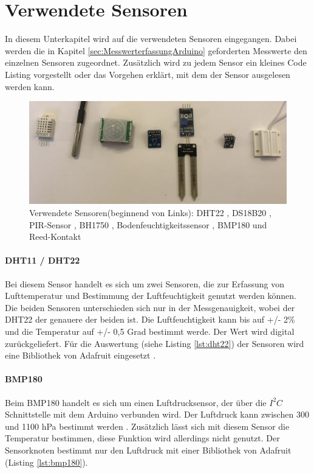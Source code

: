 \section{Verwendete Sensoren}
In diesem Unterkapitel wird auf die verwendeten Sensoren eingegangen. Dabei werden die in Kapitel \ref{sec:MesswerterfassungArduino} geforderten Messwerte den einzelnen Sensoren zugeordnet. Zusätzlich wird zu jedem Sensor ein kleines Code Listing vorgestellt oder das Vorgehen erklärt, mit dem der Sensor ausgelesen werden kann.
\begin{figure}
	\centering
	\includegraphics[width=1\textwidth]{bilder/sensoren.jpg}
	\caption[Verwendete Sensoren]{Verwendete Sensoren(beginnend von Links): DHT22 , DS18B20 , PIR-Sensor , BH1750 , Bodenfeuchtigkeitssensor , BMP180  und Reed-Kontakt}
	\label{sec:KonzeptionMeshNetz}
\end{figure}

\paragraph{DHT11 / DHT22} Bei diesem Sensor handelt es sich um zwei Sensoren, die zur Erfassung von Lufttemperatur und Bestimmung der Luftfeuchtigkeit genutzt werden können. Die beiden Sensoren unterschieden sich nur in der Messgenauigkeit, wobei der DHT22 der genauere der beiden ist. Die Luftfeuchtigkeit kann bis auf +/- 2\% und die Temperatur auf +/- 0,5 Grad bestimmt werde. Der Wert wird digital zurückgeliefert. Für die Auswertung (siehe Listing \ref{lst:dht22}) der Sensoren wird eine Bibliothek von Adafruit eingesetzt \cite{adafruit2016dht}.



\paragraph{BMP180} Beim BMP180 handelt es sich um einen Luftdrucksensor, der über die $I^2C$ Schnittstelle mit dem Arduino verbunden wird. Der Luftdruck kann zwischen 300 und 1100 hPa bestimmt werden \cite{sensortec2013data}. Zusätzlich lässt sich mit diesem Sensor die Temperatur bestimmen, diese Funktion wird allerdings nicht genutzt. Der Sensorknoten bestimmt nur den Luftdruck mit einer Bibliothek von Adafruit (Listing \ref{lst:bmp180}). 



